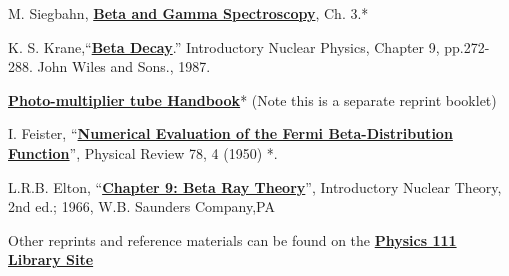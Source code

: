 \documentclass{../lab}
\begin{document}
\begin{thebibliography}{}
\label{sec:References}
     M. Siegbahn, \href{http://physics111.lib.berkeley.edu/Physics111/Reprints/BRA/02-Beta\_Ray\_Spectrometer.pdf}{\textbf{Beta and Gamma Spectroscopy}}, Ch. 3.*

     K. S. Krane,``\href{http://physics111.lib.berkeley.edu/Physics111/Reprints/BRA/03-Beta\_Decay.pdf}{\textbf{Beta Decay}}.'' Introductory Nuclear Physics, Chapter 9, pp.272-288. John Wiles and Sons., 1987.

     \href{http://physics111.lib.berkeley.edu/Physics111/Equipment\_Manuals/RCA\_PMT.pdf}{\textbf{Photo-multiplier tube Handbook}}* (Note this is a separate reprint booklet)

     I. Feister, ``\href{http://physics111.lib.berkeley.edu/Physics111/Reprints/BRA/Feister_EvaluationoftheFermiBeta-DistributionFunction.pdf}{\textbf{Numerical Evaluation of the Fermi Beta-Distribution Function}}'', Physical Review 78, 4 (1950) *\*.

     L.R.B. Elton, ``\href{http://physics111.lib.berkeley.edu/Physics111/Reprints/BRA/Elton\_Nuclear\%20Theory\%20Ch.\%209\%20Beta\%20Decay.pdf}{\textbf{Chapter 9: Beta Ray Theory}}'', Introductory Nuclear Theory, 2nd ed.; 1966, W.B. Saunders Company,PA
\end{thebibliography}

Other reprints and reference materials can be found on the \href{http://physics111.lib.berkeley.edu/Physics111/Reprints/BRA/BRA\_index.html}{\textbf{Physics 111 Library Site}}
\end{document}
